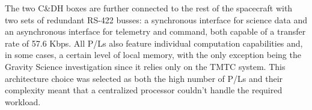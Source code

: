 The two C\&DH boxes are further connected to the rest of the spacecraft with two sets of redundant RS-422 busses: a synchronous interface for science data and an asynchronous interface for telemetry and command, both capable of a transfer rate of 57.6 Kbps. \cite{UVS_info} \cite{MWR_info} 
All P/Ls also feature individual computation capabilities and, in some cases, a certain level of local memory, with the only exception being the Gravity Science investigation since it relies only on the TMTC system. This architecture choice was selected as both the high number of P/Ls and their complexity meant that a centralized processor couldn't handle the required workload. 